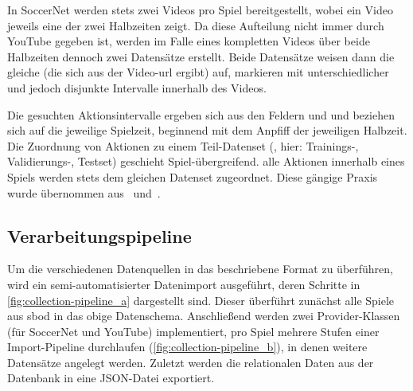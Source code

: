 In SoccerNet werden stets zwei Videos pro Spiel bereitgestellt, wobei ein Video jeweils eine der zwei Halbzeiten zeigt.
Da diese Aufteilung nicht immer durch YouTube gegeben ist, werden im Falle eines kompletten Videos über beide Halbzeiten dennoch zwei Datensätze erstellt.
Beide Datensätze weisen dann die gleiche  (die sich aus der Video-\gls{url} ergibt) auf, markieren mit unterschiedlicher  und  jedoch disjunkte Intervalle innerhalb des Videos.

Die gesuchten Aktionsintervalle ergeben sich aus den Feldern  und  und beziehen sich auf die jeweilige Spielzeit, beginnend mit dem Anpfiff der jeweiligen Halbzeit.
Die Zuordnung von Aktionen zu einem Teil-Datenset (, hier: Trainings-, Validierungs-, Testset) geschieht Spiel-übergreifend.
\Dh alle Aktionen innerhalb eines Spiels werden stets dem gleichen Datenset zugeordnet.
Diese gängige Praxis wurde übernommen aus~\cite{Giancola18} und~\cite{Jiang19}.

\subsection{Verarbeitungspipeline}
\label{subsec:pipeline}

Um die verschiedenen Datenquellen in das beschriebene Format zu überführen, wird ein semi-automatisierter Datenimport ausgeführt, deren Schritte in \autoref{fig:collection-pipeline_a} dargestellt sind.
Dieser überführt zunächst alle Spiele aus \gls{sbod} in das obige Datenschema.
Anschließend werden zwei Provider-Klassen (für SoccerNet und YouTube) implementiert, pro Spiel mehrere Stufen einer Import-Pipeline durchlaufen (\autoref{fig:collection-pipeline_b}), in denen weitere Datensätze angelegt werden.
Zuletzt werden die relationalen Daten aus der Datenbank in eine JSON-Datei exportiert.

